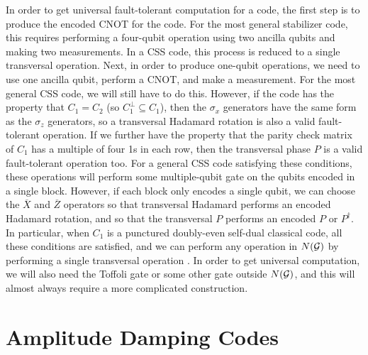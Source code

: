 \documentclass{report}
\newcommand{\G}{{\cal G}}
\newcommand{\X}{\sigma_x}
\newcommand{\Z}{\sigma_z}
\newcommand{\Xbar}{\overline{X}}
\newcommand{\Zbar}{\overline{Z}}
\begin{document}
In order to get universal fault-tolerant computation for a code, the first
step is to produce the encoded CNOT for the code.  For the most general
stabilizer code, this requires performing a four-qubit operation using
two ancilla qubits and making two measurements.  In a CSS code, this process
is reduced to a single transversal operation.  Next, in order to produce
one-qubit operations, we need to use one ancilla qubit, perform a CNOT, and
make a measurement.  For the most general CSS code, we will still have to
do this.  However, if the code has the property that $C_1 = C_2$ (so
$C_1^{\perp} \subseteq C_1$), then the $\X$ generators have the same form
as the $\Z$ generators, so a transversal Hadamard rotation is also a valid
fault-tolerant operation.  If we further have the property that the parity 
check matrix of $C_1$ has a multiple of four 1s in each row, then the 
transversal phase $P$ is a valid fault-tolerant operation too.  For a general 
CSS code satisfying these conditions, these operations will perform some 
multiple-qubit gate on the qubits encoded in a single block.  However, if each 
block only encodes a single qubit, we can choose the $\Xbar$ and $\Zbar$ 
operators so that transversal Hadamard performs an encoded Hadamard rotation, 
and so that the transversal $P$ performs an encoded $P$ or $P^\dagger$.  In
particular, when $C_1$ is a punctured doubly-even self-dual classical code,
all these conditions are satisfied, and we can perform any operation in
$N(\G)$ by performing a single transversal operation \cite{shor-fault-tol}.  
In order to get universal computation, we will also need the Toffoli gate or 
some other gate outside $N(\G)$, and this will almost always require a more 
complicated construction.

\section{Amplitude Damping Codes}
\end{document}
